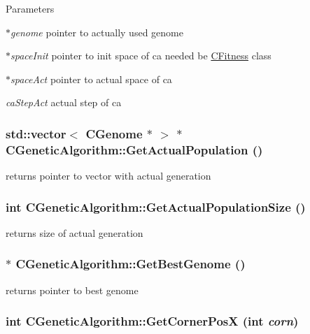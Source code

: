 \begin{DoxyParams}{Parameters}
\item[{\em $\ast$genome}]pointer to actually used genome \item[{\em $\ast$spaceInit}]pointer to init space of ca needed be \hyperlink{classCFitness}{CFitness} class \item[{\em $\ast$spaceAct}]pointer to actual space of ca \item[{\em caStepAct}]actual step of ca \end{DoxyParams}
\hypertarget{classCGeneticAlgorithm_a4066729944a04f47bf4c38257d330cb3}{
\subsubsection[{GetActualPopulation}]{\setlength{\rightskip}{0pt plus 5cm}std::vector$<$ {\bf CGenome} $\ast$ $>$ $\ast$ CGeneticAlgorithm::GetActualPopulation ()}}
\label{classCGeneticAlgorithm_a4066729944a04f47bf4c38257d330cb3}
returns pointer to vector with actual generation \hypertarget{classCGeneticAlgorithm_ad320e9d2f781d4f503f4edf66b6abc07}{
\subsubsection[{GetActualPopulationSize}]{\setlength{\rightskip}{0pt plus 5cm}int CGeneticAlgorithm::GetActualPopulationSize ()}}
\label{classCGeneticAlgorithm_ad320e9d2f781d4f503f4edf66b6abc07}
returns size of actual generation \hypertarget{classCGeneticAlgorithm_a3fe743e1c6ca8f2387410063ce42fb5c}{
\subsubsection[{GetBestGenome}]{ $\ast$ CGeneticAlgorithm::GetBestGenome ()}}
\label{classCGeneticAlgorithm_a3fe743e1c6ca8f2387410063ce42fb5c}
returns pointer to best genome \hypertarget{classCGeneticAlgorithm_a7ed37537336f7ba8c77b8944e0a9052a}{
\subsubsection[{GetCornerPosX}]{\setlength{\rightskip}{0pt plus 5cm}int CGeneticAlgorithm::GetCornerPosX (int {\em corn})}}

